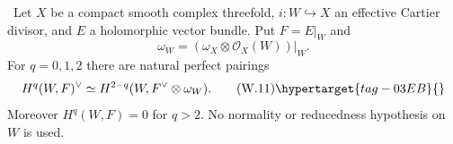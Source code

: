 \begin{theorem}
\hypertarget{tag-03IY}{}\label{wbII:thm:cartier-duality}

\ Let $X$ be a compact smooth complex threefold,
$i:W\hookrightarrow X$ an effective Cartier divisor, and $E$ a holomorphic
vector bundle.  Put $F=E|_W$ and
\[
\omega_W=(\omega_X\otimes\mathcal O_X(W))|_W.
\]
For $q=0,1,2$ there are natural perfect pairings
\[
H^q(W,F)^\vee
\simeq H^{2-q}(W,F^\vee\otimes\omega_W).
\tag{W.11}\hypertarget{tag-03EB}{}\label{wbII:eq:W:5.11}
\]
Moreover $H^q(W,F)=0$ for $q>2$.  No normality or reducedness hypothesis on
$W$ is used.
\end{theorem}



